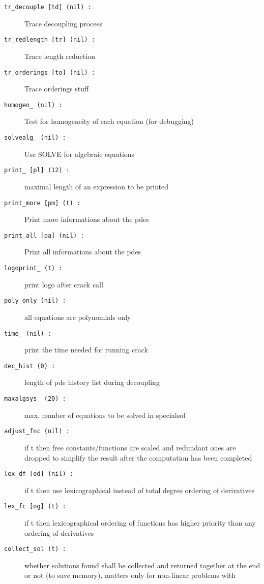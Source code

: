 \documentclass[12pt]{article}
\begin{document}
\begin{description}
\item[{\tt tr\_decouple [td] (nil) :}] Trace decoupling process
\item[{\tt tr\_redlength [tr] (nil) :}] Trace length reduction
\item[{\tt tr\_orderings [to] (nil) :}] Trace orderings stuff
\item[{\tt homogen\_ (nil) :}] Test for homogeneity of each equation 
                    (for debugging)
\item[{\tt solvealg\_ (nil) :}] Use SOLVE for algebraic equations
\item[{\tt print\_ [pl] (12) :}] maximal length of an expression to be printed
\item[{\tt print\_more [pm] (t) :}] Print more informations about the pdes
\item[{\tt print\_all [pa] (nil) :}] Print all informations about the pdes
\item[{\tt logoprint\_ (t) :}] print logo after crack call
\item[{\tt poly\_only (nil) :}] all equations are polynomials only 
\item[{\tt time\_ (nil) :}] print the time needed for running crack 
\item[{\tt dec\_hist (0) :}] length of pde history list during decoupling
\item[{\tt maxalgsys\_ (20) :}] max. number of equations to be solved
in specialsol 
\item[{\tt adjust\_fnc (nil) :}] if t then free constants/functions
                    are scaled and redundant ones are dropped to
                    simplify the result after the computation has been
                    completed
\item[{\tt lex\_df [od] (nil) :}] if t then use lexicographical
                    instead of total degree ordering of derivatives 
\item[{\tt lex\_fc [og] (t) :}] if t then lexicographical ordering of
                    functions has higher priority than any ordering of
                    derivatives 
\item[{\tt collect\_sol (t) :}] whether solutions found shall be collected and
                    returned together at the end or not (to save
                    memory), matters only for non-linear problems with

\end{description}
\end{document}
